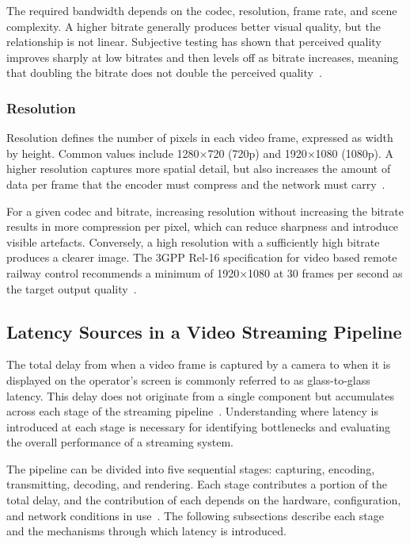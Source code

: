 The required bandwidth depends on the codec, resolution, frame rate, and scene complexity. A higher bitrate generally produces better visual quality, but the relationship is not linear. Subjective testing has shown that perceived quality improves sharply at low bitrates and then levels off as bitrate increases, meaning that doubling the bitrate does not double the perceived quality~\cite{pinson2012}.
 
\subsubsection{Resolution}\label{subsubsec:resolution}
 
Resolution defines the number of pixels in each video frame, expressed as width by height. Common values include 1280$\times$720 (720p) and 1920$\times$1080 (1080p). A higher resolution captures more spatial detail, but also increases the amount of data per frame that the encoder must compress and the network must carry~\cite{pinson2012}.
 
For a given codec and bitrate, increasing resolution without increasing the bitrate results in more compression per pixel, which can reduce sharpness and introduce visible artefacts. Conversely, a high resolution with a sufficiently high bitrate produces a clearer image. The 3GPP Rel-16 specification for video based remote railway control recommends a minimum of 1920$\times$1080 at 30 frames per second as the target output quality~\cite{mejias2024}.


\subsection{Latency Sources in a Video Streaming Pipeline}\label{sec:latency-sources}
The total delay from when a video frame is captured by a camera to when it is displayed on the operator's screen is commonly referred to as glass-to-glass latency. This delay does not originate from a single component but accumulates across each stage of the streaming pipeline~\cite{dobrian2011}. Understanding where latency is introduced at each stage is necessary for identifying bottlenecks and evaluating the overall performance of a streaming system.
 
The pipeline can be divided into five sequential stages: capturing, encoding, transmitting, decoding, and rendering. Each stage contributes a portion of the total delay, and the contribution of each depends on the hardware, configuration, and network conditions in use~\cite{kaknjo2018}. The following subsections describe each stage and the mechanisms through which latency is introduced.

